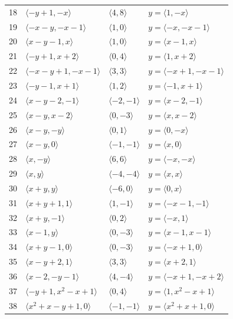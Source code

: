 \documentclass[11pt]{article}
\begin{document}
\begin{longtable}{@{}rlll@{}}
18 & $\langle -y+1,-x\rangle$ & $\langle 4,8\rangle$ & $y=\langle 1,-x\rangle$\\
19 & $\langle -x-y,-x-1\rangle$ & $\langle 1,0\rangle$ & $y=\langle -x,-x-1\rangle$\\
20 & $\langle x-y-1,x\rangle$ & $\langle 1,0\rangle$ & $y=\langle x-1,x\rangle$\\
21 & $\langle -y+1,x+2\rangle$ & $\langle 0,4\rangle$ & $y=\langle 1,x+2\rangle$\\
22 & $\langle -x-y+1,-x-1\rangle$ & $\langle 3,3\rangle$ & $y=\langle -x+1,-x-1\rangle$\\
23 & $\langle -y-1,x+1\rangle$ & $\langle 1,2\rangle$ & $y=\langle -1,x+1\rangle$\\
24 & $\langle x-y-2,-1\rangle$ & $\langle -2,-1\rangle$ & $y=\langle x-2,-1\rangle$\\
25 & $\langle x-y,x-2\rangle$ & $\langle 0,-3\rangle$ & $y=\langle x,x-2\rangle$\\
26 & $\langle x-y,-y\rangle$ & $\langle 0,1\rangle$ & $y=\langle 0,-x\rangle$\\
27 & $\langle x-y,0\rangle$ & $\langle -1,-1\rangle$ & $y=\langle x,0\rangle$\\
28 & $\langle x,-y\rangle$ & $\langle 6,6\rangle$ & $y=\langle -x,-x\rangle$\\
29 & $\langle x,y\rangle$ & $\langle -4,-4\rangle$ & $y=\langle x,x\rangle$\\
30 & $\langle x+y,y\rangle$ & $\langle -6,0\rangle$ & $y=\langle 0,x\rangle$\\
31 & $\langle x+y+1,1\rangle$ & $\langle 1,-1\rangle$ & $y=\langle -x-1,-1\rangle$\\
32 & $\langle x+y,-1\rangle$ & $\langle 0,2\rangle$ & $y=\langle -x,1\rangle$\\
33 & $\langle x-1,y\rangle$ & $\langle 0,-3\rangle$ & $y=\langle x-1,x-1\rangle$\\
34 & $\langle x+y-1,0\rangle$ & $\langle 0,-3\rangle$ & $y=\langle -x+1,0\rangle$\\
35 & $\langle x-y+2,1\rangle$ & $\langle 3,3\rangle$ & $y=\langle x+2,1\rangle$\\
36 & $\langle x-2,-y-1\rangle$ & $\langle 4,-4\rangle$ & $y=\langle -x+1,-x+2\rangle$\\
37 & $\langle -y+1,x^{2}-x+1\rangle$ & $\langle 0,4\rangle$ & $y=\langle 1,x^{2}-x+1\rangle$\\
38 & $\langle x^{2}+x-y+1,0\rangle$ & $\langle -1,-1\rangle$ & $y=\langle x^{2}+x+1,0\rangle$\\

\end{longtable}
\end{document}
